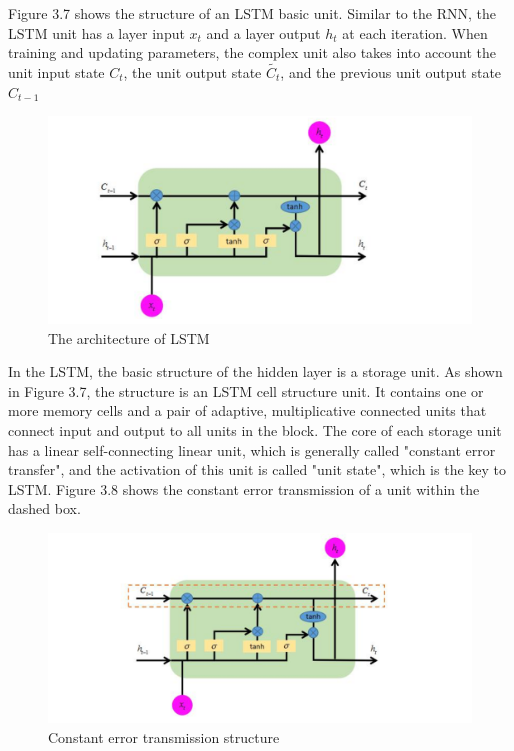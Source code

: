 Figure 3.7 shows the structure of an LSTM basic unit. Similar to the RNN, the LSTM unit has a layer input $x_{t}$ and a layer output $h_{t}$  at each iteration. When training and updating parameters, the complex unit also takes into account the unit input state $C_{t}$, the unit output state $\tilde{C_{t}}$, and the previous unit output state $C_{t-1}$

\begin{figure}[h]
	\centering
	\includegraphics[width=1.0\textwidth]{lstm1.png}
	\caption{The architecture of LSTM}
\end{figure}


In the LSTM, the basic structure of the hidden layer is a storage unit. As shown in Figure 3.7, the structure is an LSTM cell structure unit. 
It contains one or more memory cells and a pair of adaptive, multiplicative connected units that connect input and output to all units in the block. The core of each storage unit has a linear self-connecting linear unit, which is generally called "constant error transfer", and the activation of this unit is called "unit state", which is the key to LSTM. Figure 3.8 shows the constant error transmission of a unit within the dashed box.

\begin{figure}[h]
	\centering
	\includegraphics[width=1.0\textwidth]{lstm2.png}
	\caption{Constant error transmission structure}
\end{figure}


